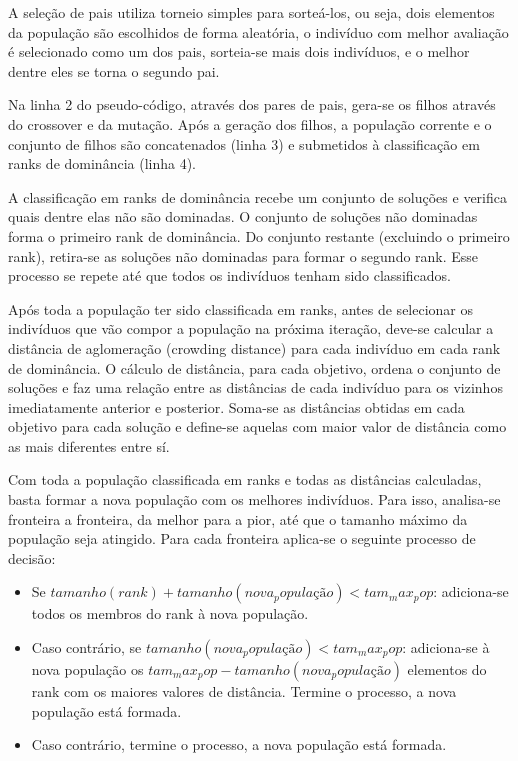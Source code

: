 A seleção de pais utiliza torneio simples para sorteá-los, ou seja, dois elementos da população são escolhidos de forma aleatória, o indivíduo com melhor avaliação é selecionado como um dos pais, sorteia-se mais dois indivíduos, e o melhor dentre eles se torna o segundo pai.

Na linha 2 do pseudo-código, através dos pares de pais, gera-se os filhos através do crossover e da mutação. Após a geração dos filhos, a população corrente e o conjunto de filhos são concatenados (linha 3) e submetidos à classificação em ranks de dominância (linha 4).

A classificação em ranks de dominância recebe um conjunto de soluções e verifica quais dentre elas não são dominadas. O conjunto de soluções não dominadas forma o primeiro rank de dominância. Do conjunto restante (excluindo o primeiro rank), retira-se as soluções não dominadas para formar o segundo rank. Esse processo se repete até que todos os indivíduos tenham sido classificados.

Após toda a população ter sido classificada em ranks, antes de selecionar os indivíduos que vão compor a população na próxima iteração, deve-se calcular a distância de aglomeração (crowding distance) para cada indivíduo em cada rank de dominância. O cálculo de distância, para cada objetivo, ordena o conjunto de soluções e faz uma relação entre as distâncias de cada indivíduo para os vizinhos imediatamente anterior e posterior. Soma-se as distâncias obtidas em cada objetivo para cada solução e define-se aquelas com maior valor de distância como as mais diferentes entre sí.

Com toda a população classificada em ranks e todas as distâncias calculadas, basta formar a nova população com os melhores indivíduos. Para isso, analisa-se fronteira a fronteira, da melhor para a pior, até que o tamanho máximo da população seja atingido. Para cada fronteira aplica-se o seguinte processo de decisão:

\begin{itemize}  
	\item Se $tamanho(rank) + tamanho(nova_população) < tam_max_pop$: adiciona-se todos os membros do rank à nova população.
	\item Caso contrário, se $tamanho(nova_população) < tam_max_pop$: adiciona-se à nova população os $tam_max_pop - tamanho(nova_população)$ elementos do rank com os maiores valores de distância. Termine o processo, a nova população está formada.
	\item Caso contrário, termine o processo, a nova população está formada.
\end{itemize}

